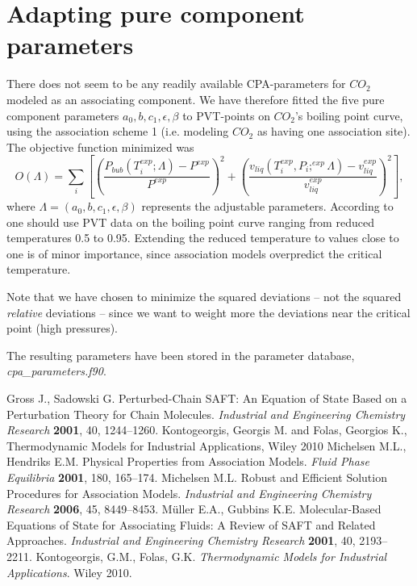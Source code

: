 \documentclass[10pt, a4paper]{article}
\newcommand{\lp}{\left(}
\newcommand{\rp}{\right)}
\begin{document}
\section{Adapting pure component parameters}
There does not seem to be any readily available CPA-parameters for $CO_2$ modeled as an associating component. We have therefore fitted the five pure component parameters $a_0,b,c_1,\epsilon,\beta$ to PVT-points on $CO_2$'s boiling point curve, using the association scheme 1 (i.e. modeling $CO_2$ as having one association site). The objective function minimized was
$$
O(\Lambda) = \sum_i \left[ \lp \frac{P_{bub}(T_i^{exp};\Lambda)-P^{exp}}{P^{exp}}\rp^2 + \lp \frac{v_{liq}(T_i^{exp},P_i;^{exp}\Lambda)-v_{liq}^{exp}}{v_{liq}^{exp}} \rp^2 \right],
$$
where $\Lambda = (a_0,b,c_1,\epsilon,\beta)$ represents the adjustable parameters. According to \cite{Kontogeorgis10} one should use PVT data on the boiling point curve ranging from reduced temperatures 0.5 to 0.95. Extending the reduced temperature to values close to one is of minor importance, since association models overpredict the critical temperature.

Note that we have chosen to minimize the squared deviations -- not the squared \textit{relative} deviations -- since we want to weight more the deviations near the critical point (high pressures).

The resulting parameters have been stored in the parameter database, \textit{cpa\_parameters.f90}.


\begin{thebibliography}{11}

 Gross J., Sadowski G. Perturbed-Chain SAFT: An Equation of State Based on a Perturbation Theory for Chain Molecules. \textit{Industrial and Engineering Chemistry Research} \textbf{2001}, 40, 1244--1260.
 Kontogeorgis, Georgis M. and Folas, Georgios K., Thermodynamic Models for Industrial Applications, Wiley 2010
 Michelsen M.L., Hendriks E.M. Physical Properties from Association Models. \textit{Fluid Phase Equilibria} \textbf{2001}, 180, 165--174.
 Michelsen M.L. Robust and Efficient Solution Procedures for Association Models. \textit{Industrial and Engineering Chemistry Research} \textbf{2006}, 45, 8449--8453.
 M{\"u}ller E.A., Gubbins K.E. Molecular-Based Equations of State for Associating Fluids: A Review of SAFT and Related Approaches. \textit{Industrial and Engineering Chemistry Research} \textbf{2001}, 40, 2193--2211.
 Kontogeorgis, G.M., Folas, G.K. \textit{Thermodynamic Models for Industrial Applications}. Wiley 2010.

\end{thebibliography}
\end{document}
